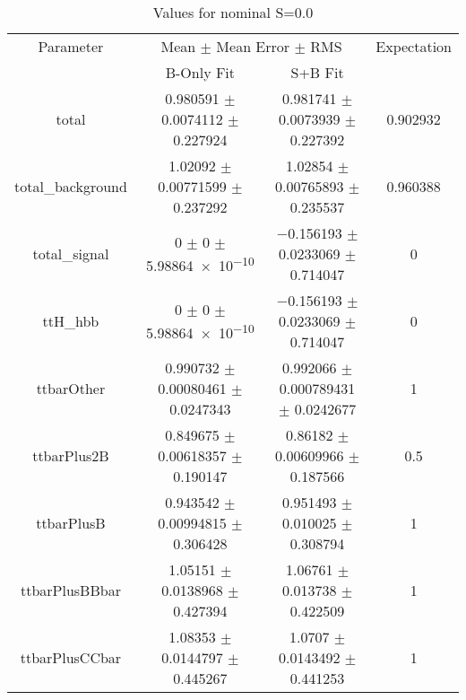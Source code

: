 \begin{table}
\centering
\caption{Values for nominal S=0.0}
\begin{tabular}{cccc}
\toprule
Parameter & \multicolumn{2}{c}{Mean $\pm$ Mean Error $\pm$ RMS} & Expectation\\
 & B-Only Fit & S+B Fit & \\
\midrule
total & \num{0.980591} $\pm$ \num{0.0074112} $\pm$ \num{0.227924} & \num{0.981741} $\pm$ \num{0.0073939} $\pm$ \num{0.227392} & \num{0.902932}\\
total\_background & \num{1.02092} $\pm$ \num{0.00771599} $\pm$ \num{0.237292} & \num{1.02854} $\pm$ \num{0.00765893} $\pm$ \num{0.235537} & \num{0.960388}\\
total\_signal & \num{0} $\pm$ \num{0} $\pm$ \num{5.98864e-10} & \num{-0.156193} $\pm$ \num{0.0233069} $\pm$ \num{0.714047} & \num{0}\\
ttH\_hbb & \num{0} $\pm$ \num{0} $\pm$ \num{5.98864e-10} & \num{-0.156193} $\pm$ \num{0.0233069} $\pm$ \num{0.714047} & \num{0}\\
ttbarOther & \num{0.990732} $\pm$ \num{0.00080461} $\pm$ \num{0.0247343} & \num{0.992066} $\pm$ \num{0.000789431} $\pm$ \num{0.0242677} & \num{1}\\
ttbarPlus2B & \num{0.849675} $\pm$ \num{0.00618357} $\pm$ \num{0.190147} & \num{0.86182} $\pm$ \num{0.00609966} $\pm$ \num{0.187566} & \num{0.5}\\
ttbarPlusB & \num{0.943542} $\pm$ \num{0.00994815} $\pm$ \num{0.306428} & \num{0.951493} $\pm$ \num{0.010025} $\pm$ \num{0.308794} & \num{1}\\
ttbarPlusBBbar & \num{1.05151} $\pm$ \num{0.0138968} $\pm$ \num{0.427394} & \num{1.06761} $\pm$ \num{0.013738} $\pm$ \num{0.422509} & \num{1}\\
ttbarPlusCCbar & \num{1.08353} $\pm$ \num{0.0144797} $\pm$ \num{0.445267} & \num{1.0707} $\pm$ \num{0.0143492} $\pm$ \num{0.441253} & \num{1}\\
\bottomrule
\end{tabular}
\end{table}